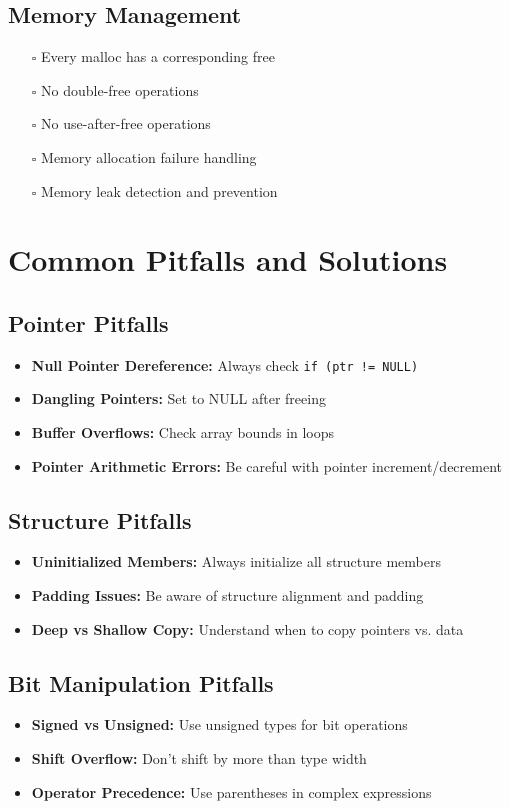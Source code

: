 \documentclass[11pt,a4paper]{article}
\begin{document}
\subsection{Memory Management}
\begin{itemize}
    \item[$\square$] Every malloc has a corresponding free
    \item[$\square$] No double-free operations
    \item[$\square$] No use-after-free operations
    \item[$\square$] Memory allocation failure handling
    \item[$\square$] Memory leak detection and prevention
\end{itemize}

\section{Common Pitfalls and Solutions}

\subsection{Pointer Pitfalls}
\begin{itemize}
    \item \textbf{Null Pointer Dereference:} Always check \texttt{if (ptr != NULL)}
    \item \textbf{Dangling Pointers:} Set to NULL after freeing
    \item \textbf{Buffer Overflows:} Check array bounds in loops
    \item \textbf{Pointer Arithmetic Errors:} Be careful with pointer increment/decrement
\end{itemize}

\subsection{Structure Pitfalls}
\begin{itemize}
    \item \textbf{Uninitialized Members:} Always initialize all structure members
    \item \textbf{Padding Issues:} Be aware of structure alignment and padding
    \item \textbf{Deep vs Shallow Copy:} Understand when to copy pointers vs. data
\end{itemize}

\subsection{Bit Manipulation Pitfalls}
\begin{itemize}
    \item \textbf{Signed vs Unsigned:} Use unsigned types for bit operations
    \item \textbf{Shift Overflow:} Don't shift by more than type width
    \item \textbf{Operator Precedence:} Use parentheses in complex expressions
\end{itemize}
\end{document}
